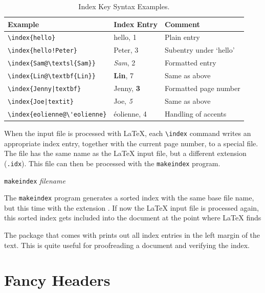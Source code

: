 \begin{table}[!tp]
\caption{Index Key Syntax Examples.}
\label{index}
\begin{center}
\begin{tabular}{@{}lll@{}}
  \textbf{Example} &\textbf{Index Entry} &\textbf{Comment}\\\hline
  \rule{0pt}{1.05em}\verb|\index{hello}| &hello, 1 &Plain entry\\ 
\verb|\index{hello!Peter}|   &\hspace*{2ex}Peter, 3 &Subentry under `hello'\\ 
\verb|\index{Sam@\textsl{Sam}}|     &\textsl{Sam}, 2& Formatted entry\\ 
\verb|\index{Lin@\textbf{Lin}}|     &\textbf{Lin}, 7& Same as above\\ 
\verb.\index{Jenny|textbf}.     &Jenny, \textbf{3}& Formatted page number\\
\verb.\index{Joe|textit}.     &Joe, \textit{5}& Same as above\\
\verb.\index{eolienne@\'eolienne}.     &\'eolienne, 4& Handling of accents
\end{tabular}
\end{center}
\end{table}

When the input file is processed with \LaTeX{}, each \verb|\index|
command writes an appropriate index entry, together with the current
page number, to a special file. The file has the same name as the
\LaTeX{} input file, but a different extension (\verb|.idx|). This
 file can then be processed with the \texttt{makeindex}
program.

\begin{lscommand}
  \texttt{makeindex} \emph{filename}
\end{lscommand}
The \texttt{makeindex} program generates a sorted index with the same base
file name, but this time with the extension . If now the
\LaTeX{} input file is processed again, this sorted index gets
included into the document at the point where \LaTeX{} finds
\begin{lscommand}
\end{lscommand}

The  package that comes with \LaTeXe{} prints out all
index entries in the left margin of the text. This is quite useful for
proofreading a document and verifying the index.
   
\section{Fancy Headers}
\label{sec:fancy}

